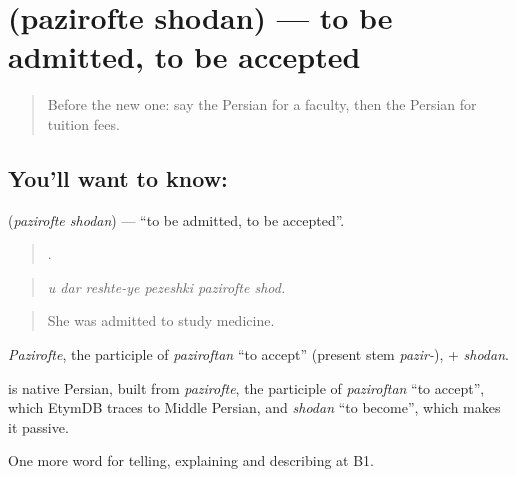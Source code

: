 \section[\texorpdfstring{\fa{پذیرفته} \fa{شدن} (pazirofte shodan)}{پذیرفته شدن (pazirofte shodan)}]{  (pazirofte shodan) — to be admitted, to be accepted}

\label{lesson:FA-C400-pazirofte-shodan}



\begin{quote}
Before the new one: say the Persian for a faculty, then the Persian for tuition fees.
\end{quote}

\subsection*{You'll want to know:  }
\textbf{ } (\emph{pazirofte shodan}) — \textquotedblleft{}to be admitted, to be accepted\textquotedblright{}.

\begin{quote}
     .
\end{quote}

\begin{quote}
\emph{u dar reshte-ye pezeshki pazirofte shod.}
\end{quote}

\begin{quote}
She was admitted to study medicine.
\end{quote}

\emph{Pazirofte}, the participle of \emph{paziroftan} \textquotedblleft{}to accept\textquotedblright{} (present stem \emph{pazir-}), + \emph{shodan}.

\begin{cousinweb}
\textbf{ } is native Persian, built from \emph{pazirofte}, the participle of \emph{paziroftan} \textquotedblleft{}to accept\textquotedblright{}, which EtymDB traces to Middle Persian, and \emph{shodan} \textquotedblleft{}to become\textquotedblright{}, which makes it passive.
\end{cousinweb}

\begin{grammarlens}[title={What you've built}]
One more word for telling, explaining and describing at B1.
\end{grammarlens}

